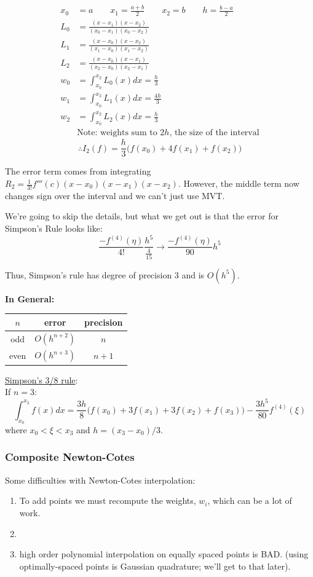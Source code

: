\documentclass[12pt]{exam}
\begin{document}
\begin{align*}
x_0 &= a \qquad x_1 = \frac{a+b}{2} \qquad x_2=b \qquad h=\frac{b-a}{2}\\
%
L_0 &= \frac{(x-x_1)(x-x_2)}{(x_0-x_1)(x_0-x_2)}\\
L_1 &= \frac{(x-x_0)(x-x_2)}{(x_1-x_0)(x_1-x_2)}\\
L_2 &= \frac{(x-x_0)(x-x_1)}{(x_2-x_0)(x_2-x_1)}\\
%
w_0 &= \int_{x_0}^{x_2} L_0(x)dx = \frac{h}{3}\\
w_1 &= \int_{x_0}^{x_2} L_1(x)dx = \frac{4h}{3}\\
w_2 &= \int_{x_0}^{x_2} L_2(x)dx = \frac{h}{3}\\
&\text{Note: weights sum to }2h\text{, the size of the interval}\nonumber
\end{align*}
\ifprintanswers
\[\therefore I_2(f) = \frac{h}{3}\bigl(f(x_0) + 4f(x_1) + f(x_2)\bigr) \]
\else
\vspace*{2em}
\fi
 
The error term comes from integrating $R_2 = \frac{1}{3!}f'''(c)(x-x_0)(x-x_1)(x-x_2)$. However, the middle term now changes sign over the interval and we can't just use MVT.

We're going to skip the details, but what we get out is that the error for Simpson's Rule looks like:
\[\frac{-f^{(4)}(\eta)}{4!}\frac{h^5}{\frac{4}{15}} \rightarrow \boxed{\frac{-f^{(4)}(\eta)}{90}h^5}\]

Thus, Simpson's rule has degree of precision 3 and is $O(h^5)$.

\textbf{In General:}
\vspace*{-1em}
\begin{center}
\begin{tabular}{c c c}
$n$  & error        & precision \\ \hline
odd  & $O(h^{n+2})$ & $n$ \\
even & $O(h^{n+3})$ & $n+1$ \\
\end{tabular}
\end{center}

\underline{Simpson's 3/8 rule}:\\
If $n=3$:
\[\int_{x_0}^{x_3} f(x)dx = \frac{3h}{8}\bigl(f(x_0) + 3f(x_1) + 3f(x_2) + f(x_3)\bigr) - \frac{3h^5}{80}f^{(4)}(\xi)\]
where $x_0 < \xi < x_3$ and $h=(x_3 - x_0)/3$.

\subsubsection*{Composite Newton-Cotes}
Some difficulties with Newton-Cotes interpolation:
\begin{enumerate}
\ifprintanswers
\item To add points we must recompute the weights, $w_i$, which can be a lot of work.
\else
\item\fi
\item high order polynomial interpolation on equally spaced points is BAD. (using optimally-spaced points is Gaussian quadrature; we'll get to that later).
\end{enumerate}
\end{document}
